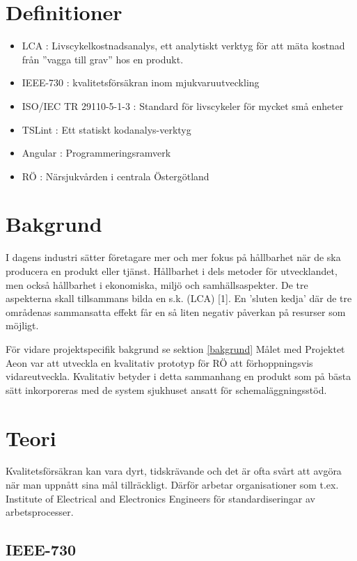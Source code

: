 \section{Definitioner}
\begin{itemize}
	\item LCA :  Livscykelkostnadsanalys, ett analytiskt verktyg för att mäta kostnad från ''vagga till grav'' hos en produkt.
	\item IEEE-730 : kvalitetsförsäkran inom mjukvaruutveckling
	\item ISO/IEC TR 29110-5-1-3 : Standard för livscykeler för mycket små enheter
	\item TSLint : Ett statiskt kodanalys-verktyg
	\item Angular : Programmeringsramverk
	\item RÖ : Närsjukvården i centrala Östergötland
\end{itemize}

\section{Bakgrund}
I dagens industri sätter företagare mer och mer fokus på hållbarhet när de ska producera en produkt eller tjänst. Hållbarhet i dels metoder för utvecklandet, men också hållbarhet i ekonomiska, miljö och samhällsaspekter.
De tre aspekterna skall tillsammans bilda en s.k. (LCA) [1]. En ’sluten kedja’ där de tre områdenas sammansatta effekt får en så liten negativ påverkan på resurser som möjligt.

För vidare projektspecifik bakgrund se sektion \ref{bakgrund}
Målet med Projektet Aeon var att utveckla en kvalitativ prototyp för RÖ att förhoppningsvis vidareutveckla. Kvalitativ betyder i detta sammanhang en produkt som på bästa sätt inkorporeras med de system sjukhuset ansatt för schemaläggningsstöd.

\section{Teori}

Kvalitetsförsäkran kan vara dyrt, tidskrävande och det är ofta svårt att avgöra när man uppnått sina mål tillräckligt.\cite{lighthouse}
Därför arbetar organisationer som t.ex. Institute of Electrical and Electronics Engineers för standardiseringar av arbetsprocesser.

\subsection{IEEE-730}

